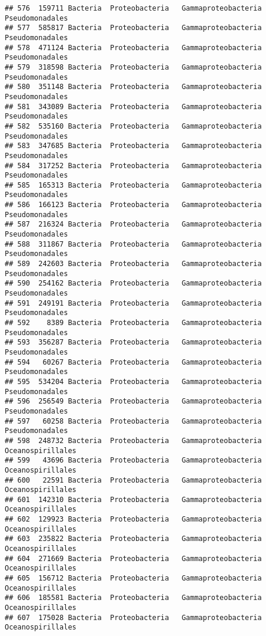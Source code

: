 \documentclass[
]{article}
\begin{document}
\begin{verbatim}
## 576  159711 Bacteria  Proteobacteria   Gammaproteobacteria     Pseudomonadales
## 577  585817 Bacteria  Proteobacteria   Gammaproteobacteria     Pseudomonadales
## 578  471124 Bacteria  Proteobacteria   Gammaproteobacteria     Pseudomonadales
## 579  318598 Bacteria  Proteobacteria   Gammaproteobacteria     Pseudomonadales
## 580  351148 Bacteria  Proteobacteria   Gammaproteobacteria     Pseudomonadales
## 581  343089 Bacteria  Proteobacteria   Gammaproteobacteria     Pseudomonadales
## 582  535160 Bacteria  Proteobacteria   Gammaproteobacteria     Pseudomonadales
## 583  347685 Bacteria  Proteobacteria   Gammaproteobacteria     Pseudomonadales
## 584  317252 Bacteria  Proteobacteria   Gammaproteobacteria     Pseudomonadales
## 585  165313 Bacteria  Proteobacteria   Gammaproteobacteria     Pseudomonadales
## 586  166123 Bacteria  Proteobacteria   Gammaproteobacteria     Pseudomonadales
## 587  216324 Bacteria  Proteobacteria   Gammaproteobacteria     Pseudomonadales
## 588  311867 Bacteria  Proteobacteria   Gammaproteobacteria     Pseudomonadales
## 589  242603 Bacteria  Proteobacteria   Gammaproteobacteria     Pseudomonadales
## 590  254162 Bacteria  Proteobacteria   Gammaproteobacteria     Pseudomonadales
## 591  249191 Bacteria  Proteobacteria   Gammaproteobacteria     Pseudomonadales
## 592    8389 Bacteria  Proteobacteria   Gammaproteobacteria     Pseudomonadales
## 593  356287 Bacteria  Proteobacteria   Gammaproteobacteria     Pseudomonadales
## 594   60267 Bacteria  Proteobacteria   Gammaproteobacteria     Pseudomonadales
## 595  534204 Bacteria  Proteobacteria   Gammaproteobacteria     Pseudomonadales
## 596  256549 Bacteria  Proteobacteria   Gammaproteobacteria     Pseudomonadales
## 597   60258 Bacteria  Proteobacteria   Gammaproteobacteria     Pseudomonadales
## 598  248732 Bacteria  Proteobacteria   Gammaproteobacteria   Oceanospirillales
## 599   43696 Bacteria  Proteobacteria   Gammaproteobacteria   Oceanospirillales
## 600   22591 Bacteria  Proteobacteria   Gammaproteobacteria   Oceanospirillales
## 601  142310 Bacteria  Proteobacteria   Gammaproteobacteria   Oceanospirillales
## 602  129923 Bacteria  Proteobacteria   Gammaproteobacteria   Oceanospirillales
## 603  235822 Bacteria  Proteobacteria   Gammaproteobacteria   Oceanospirillales
## 604  271669 Bacteria  Proteobacteria   Gammaproteobacteria   Oceanospirillales
## 605  156712 Bacteria  Proteobacteria   Gammaproteobacteria   Oceanospirillales
## 606  185581 Bacteria  Proteobacteria   Gammaproteobacteria   Oceanospirillales
## 607  175028 Bacteria  Proteobacteria   Gammaproteobacteria   Oceanospirillales

\end{verbatim}
\end{document}
